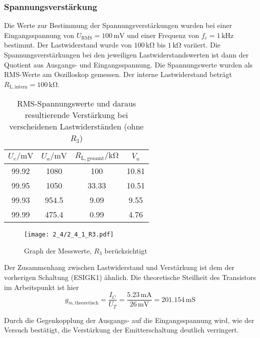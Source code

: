 \subsubsection{Spannungsverstärkung}
Die Werte zur Bestimmung der Spannungsverstärkungen wurden bei einer
Eingangsspannung von $U_{\mathrm{RMS}} = 100 \, \si{\milli\volt}$ und einer
Frequenz von $f_e = 1 \, \si{\kilo\hertz}$ bestimmt. Der Lastwiderstand wurde
von $100 \, \si{\kilo\ohm}$ bis $1 \, \si{\kilo\ohm}$ variiert. Die
Spannungsverstärkungen bei den jeweiligen Lastwiderstandswerten ist dann
der Quotient aus Ausgangs- und Eingangsspannung. Die Spannungswerte wurden
als RMS-Werte am Oszilloskop gemessen. Der interne Lastwiderstand beträgt $R_{\mathrm{L,intern}} =
100 \, \si{\kilo\ohm}$.


\begin{table}[H]
  \begin{center}
    \begin{tabular}{|c|c|c|c|}
      \hline
      $U_e / \si{\milli\volt}$ & $U_a / \si{\milli\volt}$ & $R_{\mathrm{L,gesamt}} / \si{\kilo\ohm}$ & $V_u$\\
      \hline
      \hline
      99.92 & 1080 & 100 & 10.81\\
      99.95 & 1050 & 33.33 & 10.51\\
      99.93 & 954.5 & 9.09 & 9.55\\
      99.99 & 475.4 & 0.99 & 4.76\\
      \hline
    \end{tabular}
  \end{center}
  \caption{RMS-Spannungswerte und daraus resultierende Verstärkung bei
    verscheidenen Lastwiderständen (ohne $R_3$)}
\end{table}

\begin{figure}[H]
  \begin{center}
    \texttt{[image: 2\_4/2\_4\_1\_R3.pdf]}
  \end{center}
  \caption{Graph der Messwerte, $R_3$ berücksichtigt}
\end{figure}

Der Zusammenhang zwischen Lastwiderstand und Verstärkung ist dem der vorherigen
Schaltung (ESIGK1) ähnlich. Die theoretische Steilheit des Transistors im Arbeitspunkt ist hier
\[g_{m,\mathrm{theoretisch}} = \frac{I_C}{U_T} = \frac{5.23 \, \si{\milli\ampere}}{26 \,
    \si{\milli\volt}} = 201.154 \, \si{\milli\siemens}\]

Durch die Gegenkopplung der Ausgangs- auf die Eingangsspannung wird, wie der
Versuch bestätigt, die Verstärkung der Emitterschaltung deutlich verringert.

